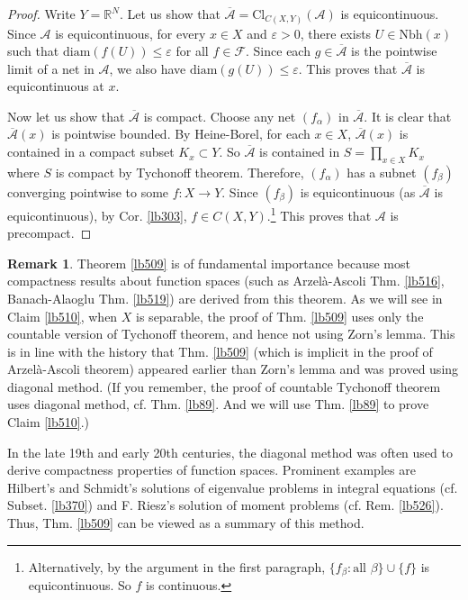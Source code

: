 \documentclass[12pt,b5paper,notitlepage]{article}
\theoremstyle{definition}
\newtheorem{rem}[df]{Remark}
\theoremstyle{plain}
\newcommand{\ovl}{\overline}
\newcommand{\scr}{\mathscr}
\newcommand{\Rbb}{\mathbb R}
\newcommand{\Nbh}{\mathrm{Nbh}}
\newcommand{\Cl}{\mathrm{Cl}}
\newcommand{\diam}{\mathrm{diam}}
\newcommand{\eps}{\varepsilon}
\numberwithin{equation}{section}
\begin{document}
\begin{proof}
Write $Y=\Rbb^N$. Let us show that $\ovl{\scr A}=\Cl_{C(X,Y)}(\scr A)$ is equicontinuous. Since $\scr A$ is equicontinuous, for every $x\in X$ and $\eps>0$, there exists $U\in\Nbh(x)$ such that $\diam(f(U))\leq\eps$ for all $f\in\scr F$. Since each $g\in\ovl{\scr A}$ is the pointwise limit of a net in $\scr A$, we also have $\diam(g(U))\leq\eps$. This proves that $\ovl{\scr A}$ is equicontinuous at $x$.


Now let us show that $\ovl{\scr A}$ is compact. Choose any net $(f_\alpha)$ in $\ovl{\scr A}$. It is clear that $\ovl{\scr A}(x)$ is pointwise bounded. By Heine-Borel, for each $x\in X$, $\ovl{\scr A}(x)$ is contained in a compact subset $K_x\subset Y$. So $\ovl{\scr A}$ is contained in $S=\prod_{x\in X}K_x$ where $S$ is compact by Tychonoff theorem. Therefore, $(f_\alpha)$ has a subnet $(f_\beta)$ converging pointwise to some $f:X\rightarrow Y$. Since $(f_\beta)$ is equicontinuous (as $\ovl{\scr A}$ is equicontinuous), by Cor. \ref{lb303}, $f\in C(X,Y)$.\footnote{Alternatively, by the argument in the first paragraph, $\{f_\beta:\text{all }\beta\}\cup\{f\}$ is equicontinuous. So $f$ is continuous.}  This proves that $\scr A$ is precompact.
\end{proof}

\begin{rem}\label{lb524}
Theorem \ref{lb509} is of fundamental importance because most compactness results about function spaces (such as Arzel\`a-Ascoli Thm. \ref{lb516}, Banach-Alaoglu Thm. \ref{lb519}) are derived from this theorem. As we will see in Claim \ref{lb510}, when $X$ is separable, the proof of Thm. \ref{lb509} uses only the countable version of Tychonoff theorem, and hence not using Zorn's lemma. This is in line with the history that Thm. \ref{lb509} (which is implicit in the proof of Arzel\`a-Ascoli theorem) appeared earlier than Zorn's lemma and was proved using diagonal method. (If you remember, the proof of countable Tychonoff theorem uses diagonal method, cf. Thm. \ref{lb89}. And we will use Thm. \ref{lb89} to prove Claim \ref{lb510}.) 

In the late 19th and early 20th centuries, the diagonal method was often used to derive compactness properties of function spaces. Prominent examples are Hilbert's and Schmidt's solutions of eigenvalue problems in integral equations (cf. Subset. \ref{lb370}) and F. Riesz's solution of moment problems (cf. Rem. \ref{lb526}). Thus, Thm. \ref{lb509} can be viewed as a summary of this method.  \hfill\qedsymbol
\end{rem}
\end{document}
